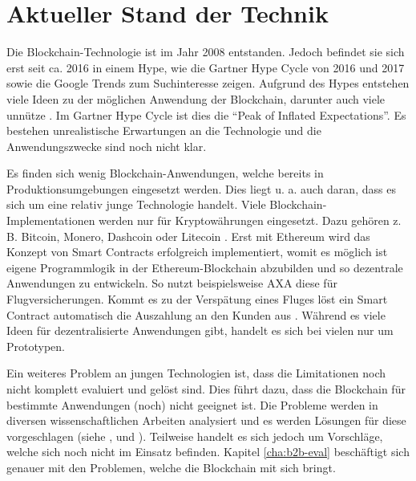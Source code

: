 \chapter{Aktueller Stand der Technik}
\label{cha:stand-technik}

Die Blockchain-Technologie ist im Jahr 2008 entstanden. Jedoch befindet sie sich erst seit ca. 2016 in einem Hype, wie die Gartner Hype Cycle von 2016 und 2017 \cite{PanettaTopTrendsGartner2017}\cite{AmyGartner2016Hype2016} sowie die Google Trends zum Suchinteresse \cite{GoogleBlockchainGoogleTrends18} zeigen. Aufgrund des Hypes entstehen viele Ideen zu der möglichen Anwendung der Blockchain, darunter auch viele unnütze \cite{WustyouneedBlockchain2017}. Im Gartner Hype Cycle ist dies die ``Peak of Inflated Expectations''. Es bestehen unrealistische Erwartungen an die Technologie und die Anwendungszwecke sind noch nicht klar. 

Es finden sich wenig Blockchain-Anwendungen, welche bereits in Produktionsumgebungen eingesetzt werden. Dies liegt u. a. auch daran, dass es sich um eine relativ junge Technologie handelt. Viele Blockchain-Implementationen werden nur für Kryptowährungen eingesetzt. Dazu gehören z. B. Bitcoin, Monero, Dashcoin oder Litecoin \cite{BlockchainHubBlockchainsDistributedLedger}. Erst mit Ethereum wird das Konzept von Smart Contracts erfolgreich implementiert, womit es möglich ist eigene Programmlogik in der Ethereum-Blockchain abzubilden und so dezentrale Anwendungen zu entwickeln. So nutzt beispielsweise AXA diese für Flugversicherungen. Kommt es zu der Verspätung eines Fluges löst ein Smart Contract automatisch die Auszahlung an den Kunden aus \cite{BoerAXAnutztEthereumBlockchain2017}. Während es viele Ideen für dezentralisierte Anwendungen gibt, handelt es sich bei vielen nur um Prototypen.

Ein weiteres Problem an jungen Technologien ist, dass die Limitationen noch nicht komplett evaluiert und gelöst sind. Dies führt dazu, dass die Blockchain für bestimmte Anwendungen (noch) nicht geeignet ist. Die Probleme werden in diversen wissenschaftlichen Arbeiten analysiert und es werden Lösungen für diese vorgeschlagen (siehe \cite{ZhengBlockchainChallengesOpportunities2017}, \cite[S.~84]{SwanBlockchainblueprintnew2015} und \cite{SchererPerformanceScalabilityBlockchain2017}). Teilweise handelt es sich jedoch um Vorschläge, welche sich noch nicht im Einsatz befinden. Kapitel \ref{cha:b2b-eval} beschäftigt sich genauer mit den Problemen, welche die Blockchain mit sich bringt.

